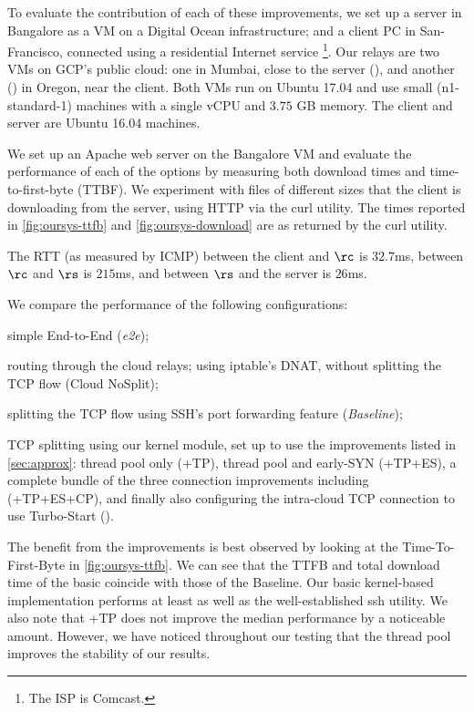 To evaluate the contribution of each of these improvements, we set up a server in Bangalore as a VM on a Digital Ocean infrastructure; and a client PC in San-Francisco, connected using a residential Internet service \footnote{The ISP is Comcast.}. Our relays are two VMs on GCP's public cloud: one in Mumbai, close to the server (\rs), and another (\rc)  in Oregon, near the client. Both VMs run on Ubuntu 17.04 and use small (n1-standard-1) machines with a single vCPU and $3.75$ GB memory. The client and server are Ubuntu 16.04 machines.

We set up an Apache web server on the Bangalore VM and evaluate the performance of each of the options by measuring both download times and time-to-first-byte (TTBF). We experiment with files of different sizes that the client is downloading from the server, using HTTP via the curl utility. The times reported in \autoref{fig:oursys-ttfb} and \autoref{fig:oursys-download}  are as returned by the curl utility. 

The RTT  (as measured by ICMP) between the client and $\rc$ is $32.7$ms, between $\rc$ and $\rs$ is $215$ms, and between $\rs$ and the server is $26$ms.

We compare the performance of the following configurations: \begin{romanlist}
     \item simple End-to-End (\textit{e2e});
     \item routing through the cloud relays; using iptable's DNAT, without splitting the TCP flow (Cloud NoSplit);
     \item splitting the TCP flow using SSH's port forwarding feature (\textit{Baseline});
     \item TCP splitting using our \oursys kernel module, set up to use the improvements listed in \autoref{sec:approx}: thread pool only (\oursys+TP), thread pool and early-SYN (\oursys+TP+ES), a complete bundle of the three connection improvements including \reconn (\oursys+TP+ES+CP), and finally also configuring the intra-cloud TCP connection to use Turbo-Start (\textit{\oursys}).
\end{romanlist}

The benefit from the improvements is best observed by looking at the Time-To-First-Byte in \autoref{fig:oursys-ttfb}. We can see that the  TTFB and total download time of the basic \oursys coincide with those of the Baseline. Our basic kernel-based implementation performs at least as well as the well-established ssh utility. We also note that \oursys+TP does not improve the median performance by a noticeable amount. However, we have noticed throughout our testing that the thread pool improves the stability of our results.

